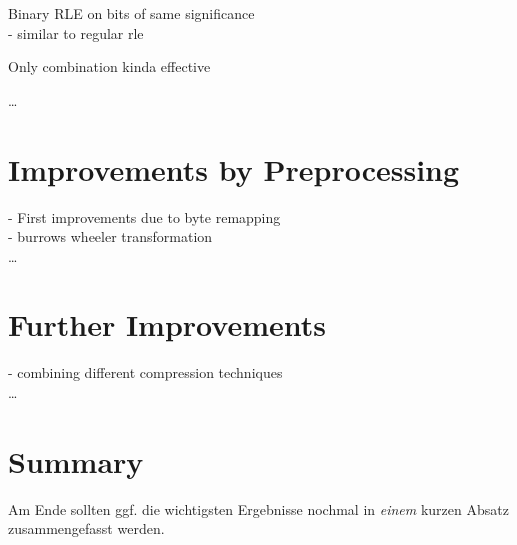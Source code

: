 \par{
Binary RLE on bits of same significance\\
- similar to regular rle\\ 
}

\par{
Only combination kinda effective
}


\ldots

\section{Improvements by Preprocessing}
\label{ch:Analysis:sec:Improvements by Preprocessing}
- First improvements due to byte remapping\\
- burrows wheeler transformation\\
\ldots

\section{Further Improvements}
\label{ch:Analysis:sec:Further Improvements}
- combining different compression techniques\\
\ldots


\section{Summary}
\label{ch:Analyse:sec:Summary}

Am Ende sollten ggf. die wichtigsten Ergebnisse nochmal in \emph{einem}
kurzen Absatz zusammengefasst werden.

